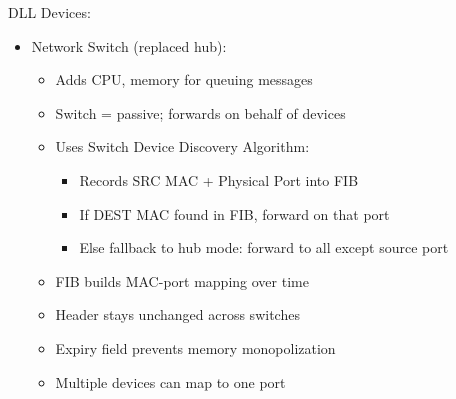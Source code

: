 \documentclass{article}
\begin{document}
DLL Devices:
\begin{itemize}
    \item Network Switch (replaced hub):
    \begin{itemize}
        \item Adds CPU, memory for queuing messages
        \item Switch = passive; forwards on behalf of devices
        \item Uses Switch Device Discovery Algorithm:
        \begin{itemize}
            \item Records {SRC MAC + Physical Port} into FIB
            \item If DEST MAC found in FIB, forward on that port
            \item Else fallback to hub mode: forward to all except source port
        \end{itemize}
        \item FIB builds MAC-port mapping over time
        \item Header stays unchanged across switches
        \item Expiry field prevents memory monopolization
        \item Multiple devices can map to one port
    \end{itemize}
\end{itemize}
\end{document}
